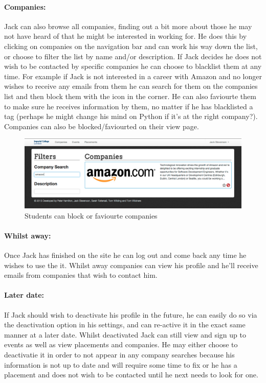 
  \paragraph{Companies:}
    Jack can also browse all companies, finding out a bit more about those he may not have heard of that he might be interested in working for. He does this by clicking on companies on the navigation bar and can work his way down the list, or choose to filter the list by name and/or description.
    If Jack decides he does not wish to be contacted by specific companies he can choose to blacklist them at any time. For example if Jack is not interested in a career with Amazon and no longer wishes to receive any emails from them he can search for them on the companies list and then block them with the icon in the corner. He can also faviourte them to make sure he receives information by them, no matter if he has blacklisted a tag (perhaps he might change his mind on Python if it's at the right company?).
    Companies can also be blocked/faviourted on their view page.

    \begin{figure}[H]\centering
    \includegraphics[scale=0.3]{images/user_experiences/student/block_amazon}
    \caption{Students can block or faviourte companies}
    \end{figure}

  \paragraph{Whilst away:}
    Once Jack has finished on the site he can log out and come back any time he wishes to use the it. Whilst away companies can view his profile and he'll receive emails from companies that wish to contact him.

  \paragraph{Later date:}
    If Jack should wish to deactivate his profile in the future, he can easily do so via the deactivation option in his settings, and can re-active it in the exact same manner at a later date. Whilst deactivated Jack can still view and sign up to events as well as view placements and companies. He may either choose to deactivatie it in order to not appear in any company searches because his information is not up to date and will require some time to fix or he has a placement and does not wish to be contacted until he next needs to look for one.

